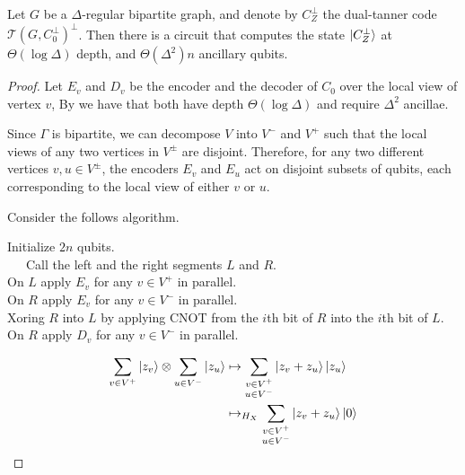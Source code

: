 \documentclass[manuscript,screen,review]{acmart}
\begin{document}
\begin{claim} 
  Let $G$ be a $\Delta$-regular bipartite graph, and denote by $C_{Z}^{\perp}$ the dual-tanner code $\mathcal{T}(G,C^{\perp}_{0})^\perp$. Then there is a circuit that computes the state $\ket{C_{Z}^{\perp}}$ at $\Theta(\log \Delta)$ depth, and $\Theta(\Delta^{2})n$ ancillary qubits.
\end{claim}


\begin{proof}
  Let $E_{v}$ and $D_{v}$ be the encoder and the decoder of $C_{0}$ over the local view of vertex $v$, By \cite{moore1998parallel} we have that both have  depth $\Theta(\log \Delta)$ and require $\Delta^{2}$ ancillae. 

Since $\Gamma$ is bipartite, we can decompose $V$ into $V^{-}$ and $V^{+}$ such that the local views of any two vertices in $V^{\pm}$ are disjoint. Therefore, for any two different vertices $v,u \in V^{\pm}$, the encoders $E_v$ and $E_u$ act on disjoint subsets of qubits, each corresponding to the local view of either $v$ or $u$.

  Consider the follows algorithm. 

  \begin{algorithm}[H]
    Initialize $2n$ qubits. \\ 
    \ \ \ Call the left and the right segments $L$ and $R$. \\ 
    On $L$ apply $E_{v}$ for any $v \in V^{+}$ in parallel. \\ 
    On $R$ apply $E_{v}$ for any $v \in V^{-}$ in parallel. \\ 
    Xoring $R$ into $L$ by applying CNOT from the $i$th bit of $R$ into the $i$th bit of $L$. \\
    On $R$ apply $D_{v}$ for any $v \in V^{-}$ in parallel. 
  \end{algorithm}
  


  \begin{equation*}
    \begin{split}
      \sum_{v \in V^{+}}\ket{z_{v}} \otimes \sum_{u\in V^{-}}{\ket{z_{u}}} & \mapsto  \sum_{\substack{v \in V^{+} \\ u \in V^{-}}}\ket{z_{v} + z_{u}} {\ket{z_{u}}}\\
        & \mapsto_{H_X}\sum_{\substack{v \in V^{+} \\ u \in V^{-}}}\ket{z_{v} + z_{u}}\ket{0}
    \end{split}
  \end{equation*}
\end{proof}
\end{document}

